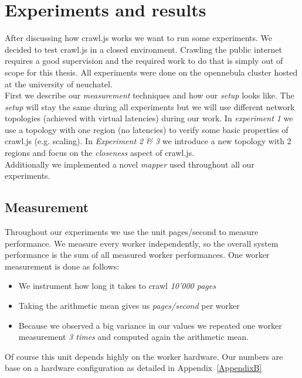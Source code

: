 
\chapter{Experiments and results} %

\label{Chapter5} %


After discussing how crawl.js works we want to run some experiments. We decided to test crawl.js in a closed environment. Crawling the public internet requires a good supervision and the required work to do that is simply out of scope for this thesis. All experiments were done on the opennebula cluster hosted at the university of neuchatel.
\\
First we describe our \emph{measurement} techniques and how our \emph{setup} looks like. The \emph{setup} will stay the same during all experiments but we will use different network topologies (achieved with virtual latencies) during our work. In \emph{experiment 1} we use a topology with one region (no latencies) to verify some basic properties of crawl.js (e.g. scaling). In \emph{Experiment 2 \& 3} we introduce a new topology with 2 regions and focus on the \emph{closeness} aspect of crawl.js.
\\
Additionally we implemented a novel \emph{mapper} used throughout all our experiments.

\section{Measurement}
Throughout our experiments we use the unit pages/second to measure performance. We measure every worker independently, so the overall system performance is the sum of all measured worker performances. One worker measurement is done as follows:
\begin{itemize}
  \item We instrument how long it takes to crawl \emph{10'000 pages}
  \item Taking the arithmetic mean gives us \emph{pages/second} per worker
  \item Because we observed a big variance in our values we repeated one worker measurement \emph{3 times} and computed again the arithmetic mean.
\end{itemize}
Of course this unit depends highly on the worker hardware. Our numbers are base on a hardware configuration as detailed in Appendix~\ref{AppendixB}


